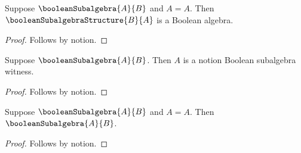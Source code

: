 

\begin{proposition}\label{notion_prefix_predicate_provider_use}
    Suppose $\booleanSubalgebra{A}{B}$ and $A=A$.
    Then $\booleanSubalgebraStructure{B}{A}$ is a Boolean algebra.
\end{proposition}
\begin{proof}
    Follows by notion.
\end{proof}

\begin{proposition}\label{notion_prefix_predicate_view_use}
    Suppose $\booleanSubalgebra{A}{B}$.
    Then $A$ is a notion Boolean subalgebra witness.
\end{proposition}
\begin{proof}
    Follows by notion.
\end{proof}

\begin{proposition}\label{notion_prefix_predicate_direct_use}
    Suppose $\booleanSubalgebra{A}{B}$ and $A=A$.
    Then $\booleanSubalgebra{A}{B}$.
\end{proposition}
\begin{proof}
    Follows by notion.
\end{proof}
